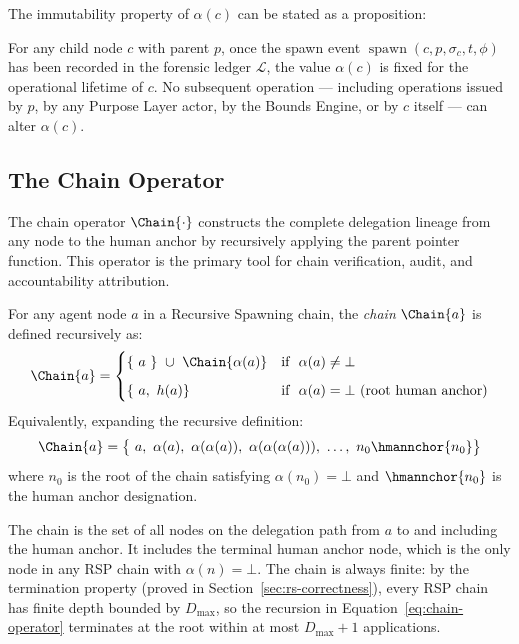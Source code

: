 The immutability property of $\alpha(c)$ can be stated as a proposition:

\begin{prop}
\label{prop:parent-pointer-immutable}
For any child node $c$ with parent $p$, once the spawn event $\operatorname{spawn}(c, p, \sigma_c, t, \phi)$ has been recorded in the forensic ledger $\mathcal{L}$, the value $\alpha(c)$ is fixed for the operational lifetime of $c$. No subsequent operation --- including operations issued by $p$, by any Purpose Layer actor, by the Bounds Engine, or by $c$ itself --- can alter $\alpha(c)$.
\end{prop}

\subsection{The Chain Operator}
\label{sec:chain-operator}

The chain operator $\Chain{\cdot}$ constructs the complete delegation lineage from any node to the human anchor by recursively applying the parent pointer function. This operator is the primary tool for chain verification, audit, and accountability attribution.

\begin{dfn}
\label{def:chain-operator}
For any agent node $a$ in a Recursive Spawning chain, the \emph{chain} $\Chain{a}$ is defined recursively as:
\begin{equation}
\Chain{a} =
\begin{cases}
\{\ a\ \}\ \cup\ \Chain{\alpha(a)} & \text{if }\ \alpha(a) \neq \bot \\[6pt]
\{\ a,\ h(a) \} & \text{if }\ \alpha(a) = \bot\ \text{(root human anchor)}
\end{cases}
\label{eq:chain-operator}
\end{equation}
Equivalently, expanding the recursive definition:
\begin{equation}
\Chain{a} = \bigl\{\ a,\ \alpha(a),\ \alpha(\alpha(a)),\ \alpha(\alpha(\alpha(a))),\ \ldots,\ n_0 \hmannchor{n_0} \bigr\}
\label{eq:chain-expanded}
\end{equation}
where $n_0$ is the root of the chain satisfying $\alpha(n_0) = \bot$ and $\hmannchor{n_0}$ is the human anchor designation.
\end{dfn}

The chain is the set of all nodes on the delegation path from $a$ to and including the human anchor. It includes the terminal human anchor node, which is the only node in any RSP chain with $\alpha(n) = \bot$. The chain is always finite: by the termination property (proved in Section~\ref{sec:rs-correctness}), every RSP chain has finite depth bounded by $D_{\max}$, so the recursion in Equation~\ref{eq:chain-operator} terminates at the root within at most $D_{\max} + 1$ applications.

